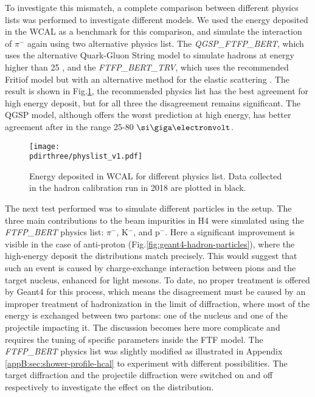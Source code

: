 To investigate this mismatch, a complete comparison between different physics lists was performed to investigate 
different models. We used the energy deposited in the WCAL as a benchmark for this comparison, and simulate the interaction of $\pi^-$ again using two alternative physics list. The \textit{QGSP\_FTFP\_BERT}, which uses the alternative Quark-Gluon String model to simulate hadrons at energy higher than 25 \gev, and the \textit{FTFP\_BERT\_TRV}, which uses the recommended Fritiof model but with an alternative method for the elastic scattering \cite{AGOSTINELLI2003250}. The result is shown in Fig.\ref{fig:geant4-hadron-plist}, the recommended physics list has the best agreement for high energy deposit, but for all three the disagreement remains significant. The QGSP model, although offers the worst prediction at high energy, has better agreement after in the range 25-80 $\gev$.

\begin{figure}[tbh!]
  \centering
  \texttt{[image: \\pdirthree/physlist\_v1.pdf]}
  \caption[Comparison of physics list for $\pi^-$ in WCAL energy spectrum]{Energy deposited in WCAL for different physics list. Data collected in the hadron calibration run in 2018 are plotted in black.}
  \label{fig:geant4-hadron-plist}
\end{figure}

The next test performed was to simulate different particles in the setup. The three main contributions to the beam impurities in H4 were simulated using the \textit{FTFP\_BERT} physics list: $\pi^-$, K$^-$, and p$^-$. Here a significant improvement is visible in the case of anti-proton (Fig.\ref{fig:geant4-hadron-particles}), where the high-energy deposit the distributions match precisely. This would suggest that such an event is caused by charge-exchange interaction between pions and the target nucleus, enhanced for light mesons. To date, no proper treatment is offered by Geant4 for this process, which means the disagreement must be caused by an improper treatment of hadronization in the limit of diffraction,  where most of the energy is exchanged between two partons: one of the nucleus and one of the projectile impacting it. The discussion becomes here more complicate and requires the tuning of specific parameters inside the FTF model.  The \textit{FTFP\_BERT} physics list was slightly modified as illustrated in Appendix \ref{appB:sec:shower-profile-hcal} to experiment with different possibilities. The target diffraction and the projectile diffraction were switched on and off respectively to investigate the effect on the distribution.



